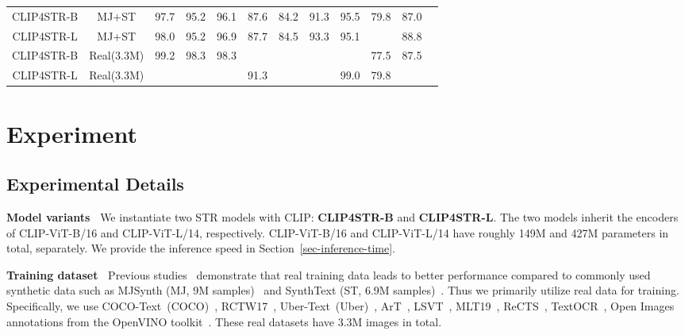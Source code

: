 \documentclass[lettersize,journal]{IEEEtran}
\begin{document}
\begin{table*}[!t]
{\begin{tabular}{l|r|c|cccccccccc}
    \midrule
    \multicolumn{2}{c|}{CLIP4STR-B}
    & MJ+ST
    & 97.7 & 95.2 & 96.1 & 87.6 & 84.2 & 91.3 & 95.5
    & 79.8 & 87.0 \\

    \multicolumn{2}{c|}{CLIP4STR-L} & MJ+ST
    & 98.0 & 95.2 & 96.9 & 87.7 & 84.5 & 93.3 & 95.1 
    & \cellcolor{Gray1}{82.7} 
    & \cellcolor{Gray2}88.8 \\

    \multicolumn{2}{c|}{CLIP4STR-B} & Real(3.3M)
    & \cellcolor{Gray2}99.2 
    & \cellcolor{Gray2}98.3 
    & 98.3 
    & \cellcolor{Gray1}{91.4}
    & \cellcolor{Gray2}{90.6} 
    & \cellcolor{Gray2}{97.2} 
    & \cellcolor{Gray1}{99.3}
    & 77.5 
    & 87.5 \\

    \multicolumn{2}{c|}{CLIP4STR-L} & Real(3.3M)
    & \cellcolor{Gray1}{99.5}
    & \cellcolor{Gray1}{98.5}
    & \cellcolor{Gray1}{98.5}
    & \cellcolor{Gray2}91.3 
    & \cellcolor{Gray1}{90.8} 
    & \cellcolor{Gray1}{97.4} 
    & \cellcolor{Gray2}99.0
    & \cellcolor{Gray2}79.8 
    & \cellcolor{Gray1}{89.2} \\
    
    \bottomrule
  \end{tabular}}
  \label{tab:main-results}
\end{table*}  
\section{Experiment}

\subsection{Experimental Details} \label{sec:exp-details}

\noindent
\textbf{Model variants~}
We instantiate two STR models with CLIP: \textbf{CLIP4STR-B} and
\textbf{CLIP4STR-L}. The two models inherit the encoders of CLIP-ViT-B/16 and CLIP-ViT-L/14, respectively.
CLIP-ViT-B/16 and CLIP-ViT-L/14 have roughly 149M and 427M parameters in total, separately. We provide the inference speed in Section~\ref{sec-inference-time}.

\noindent
\textbf{Training dataset~}
Previous studies~\cite{2021_baek_what, 2022_parseq} demonstrate that real training data leads to better performance compared to commonly used synthetic data such as MJSynth (MJ, 9M samples)~\cite{2014_max_mj} and SynthText (ST, 6.9M samples)~\cite{2016_ankush_sj}.
Thus we primarily utilize real data for training.
Specifically, we use COCO-Text~(COCO)~\cite{2016_andreas_cocotext},
RCTW17~\cite{2017_shi_rctw},
Uber-Text~(Uber)~\cite{zhang2017uber},
ArT~\cite{2019_icdar_art},
LSVT~\cite{2019_sun_lsvt},
MLT19~\cite{2019_nayef_mlt},
ReCTS~\cite{2019_zhang_rects},
TextOCR~\cite{2021_singh_textocr},
Open Images~\cite{openimages} annotations from the OpenVINO toolkit~\cite{2021_krylov_openimagev5}.
These real datasets have 3.3M images in total.
\end{document}
